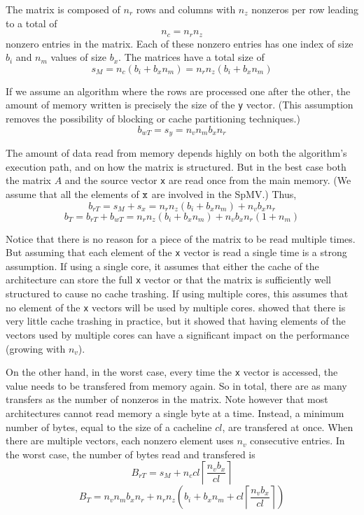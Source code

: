 \documentclass[10pt,conference,compsocconf]{IEEEtran}
\newcommand{\ceil}[1]{\left\lceil#1\right\rceil}
\begin{document}
The matrix is composed of $n_r$ rows and columns with $n_z$ nonzeros
per row leading to a total of $$n_c = n_r n_z$$ nonzero entries in
the matrix. Each of these nonzero entries has one index of size $b_i$
and $n_m$ values of size $b_x$. The matrices have a total size
of $$s_M = n_c (b_i + b_x n_m) = n_r n_z (b_i + b_x n_m)$$

If we assume an algorithm where the rows are processed one after
the other, the amount of memory written is precisely the
size of the {\tt y} vector. (This assumption removes the possibility of
blocking or cache partitioning techniques.) $$b_{wT} = s_y = n_v n_m b_x n_r$$

The amount of data read from memory depends highly on both the
algorithm's execution path, and on how the matrix is structured. But
in the best case both the matrix $A$ and the source vector {\tt x} are
read once from the main memory. (We assume that all the elements of
$\tt x$ are involved in the SpMV.)  Thus, $$b_{rT} = s_M + s_x = n_r
n_z (b_i + b_x n_m) + n_v b_x n_r$$
 $$b_T = b_{rT} + b_{wT} =  n_r n_z (b_i + b_x n_m) + n_v b_x n_r (1 + n_m)$$

Notice that there is no reason for a piece of the matrix to be read
multiple times. But assuming that each element of the {\tt x} vector
is read a single time is a strong assumption. If using a single core,
it assumes that either the cache of the architecture can store the full
{\tt x} vector or that the matrix is sufficiently well structured 
to cause no cache trashing. If using multiple cores, this assumes that
no element of the {\tt x} vectors will be used by multiple
cores. \cite{Saule13-ARXIV} showed that there is very little cache trashing
in practice, but it showed that having elements of the vectors used by
multiple cores can have a significant impact on the performance
(growing with $n_v$).

On the other hand, in the worst case, every time the {\tt x} vector is
accessed, the value needs to be transfered from memory again. So in
total, there are as many transfers as the number of nonzeros in the
matrix. Note however that most architectures cannot read memory a
single byte at a time. Instead, a minimum number of bytes, equal to
the size of a cacheline $cl$, are transfered at once.  When there are
multiple vectors, each nonzero element uses $n_v$ consecutive
entries. In the worst case, the number of bytes read and transfered is
$$B_{rT} = s_M + n_c cl \ceil{\frac{n_vb_x}{cl}} $$ 
$$B_T = n_v n_m b_x n_r + n_r n_z \left ( b_i + b_x n_m +  cl \ceil{\frac{n_vb_x}{cl}} \right)$$
\end{document}

